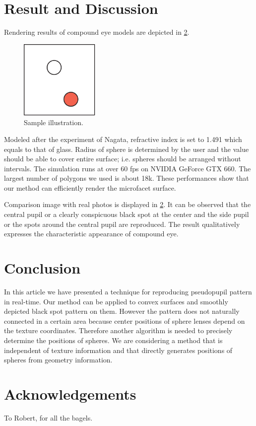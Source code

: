 \section{Result and Discussion}

Rendering results of compound eye models are depicted in \ref{}.
\begin{figure}[ht]
  \centering
  \includegraphics[width=1.5in]{images/samplefigure}
  \caption{Sample illustration.}
\end{figure}
Modeled after the experiment of Nagata, refractive index is set to 1.491 which equals to that of glass.
Radius of sphere is determined by the user and the value should be able to cover entire surface; i.e. spheres should be arranged without intervals.
The simulation runs at over 60 fps on NVIDIA GeForce GTX 660.
The largest number of polygons we used is about 18k. These performances show that our method can efficiently render the microfacet surface.

Comparison image with real photos is displayed in \ref{}.
It can be observed that the central pupil or a clearly conspicuous black spot at the center and the side pupil or the spots around the central pupil are reproduced.
The result qualitatively expresses the characteristic appearance of compound eye.

\section{Conclusion}

In this article we have presented a technique for reproducing pseudopupil pattern in real-time.
Our method can be applied to convex surfaces and smoothly depicted black spot pattern on them.
However the pattern does not naturally connected in a certain area because center positions of sphere lenses depend on the texture coordinates.
Therefore another algorithm is needed to precisely determine the positions of spheres.
We are considering a method that is independent of texture information and that directly generates positions of spheres from geometry information.


\section*{Acknowledgements}

To Robert, for all the bagels.
